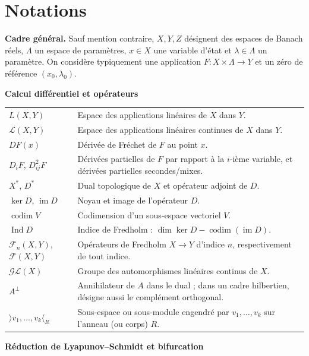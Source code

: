 \documentclass[memoire.tex]{subfiles}
\begin{document}
\section*{Notations}

\small
\renewcommand{\arraystretch}{1.12}

\noindent\textbf{Cadre général.}\quad
Sauf mention contraire, $X,Y,Z$ désignent des espaces de Banach réels,
$\Lambda$ un espace de paramètres, $x\in X$ une variable d'état et
$\lambda\in\Lambda$ un paramètre. On considère typiquement une application
$F:X\times\Lambda\rightarrow Y$ et un zéro de référence $(x_0,\lambda_0)$.

\medskip
\noindent\textbf{Calcul différentiel et opérateurs}
\smallskip

\begin{tabular}{@{}p{}p{}@{}}
$L(X,Y)$
& Espace des applications linéaires de $X$ dans $Y$.\\
$\mathcal L(X,Y)$
& Espace des applications linéaires continues de $X$ dans $Y$.\\
$DF(x)$
& Dérivée de Fréchet de $F$ au point $x$.\\
$D_iF$, $D^2_{ij}F$
& Dérivées partielles de $F$ par rapport à la $i$-ième variable, et dérivées partielles secondes/mixes.\\
$X^*$, $D^*$
& Dual topologique de $X$ et opérateur adjoint de $D$.\\
$\ker D$, $\operatorname{im}D$
& Noyau et image de l'opérateur $D$.\\
$\operatorname{codim}V$
& Codimension d'un sous-espace vectoriel $V$.\\
$\operatorname{Ind}D$
& Indice de Fredholm :
$\dim\ker D-\operatorname{codim}(\operatorname{im}D)$.\\
$\mathcal F_n(X,Y)$, $\mathcal F(X,Y)$
& Opérateurs de Fredholm $X\to Y$ d'indice $n$, respectivement de tout indice.\\
$\mathcal{GL}(X)$
& Groupe des automorphismes linéaires continus de $X$.\\
$A^\perp$
& Annihilateur de $A$ dans le dual ; dans un cadre hilbertien, désigne aussi le complément orthogonal.\\
$\rangle v_1,\ldots,v_k\langle_R$
& Sous-espace ou sous-module engendré par $v_1,\ldots,v_k$ sur l'anneau (ou corps) $R$.\\
\end{tabular}

\medskip
\noindent\textbf{Réduction de Lyapunov--Schmidt et bifurcation}
\smallskip
\end{document}
